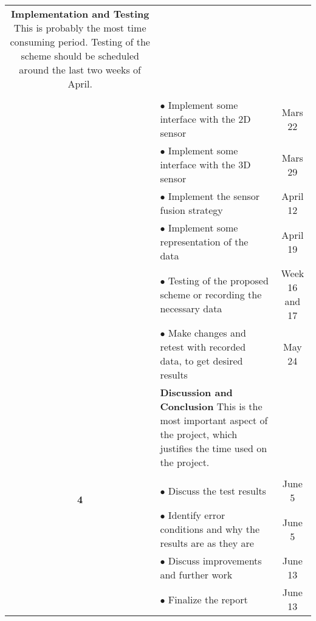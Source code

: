 \documentclass[a4paper, 10pt]{article}
\begin{document}
\begin{tabular}{| c | p{10.5cm} || c |}
                        \textbf{Implementation and Testing} This is probably the most
                        time consuming period. Testing of the scheme should be scheduled
                        around the last two weeks of April.  & \\
                        & & \\
                        & $\bullet$ Implement some interface with the 2D sensor & Mars 22  \\
                        & $\bullet$ Implement some interface with the 3D sensor & Mars 29 \\
                        & $\bullet$ Implement the sensor fusion strategy & April 12 \\
                        & $\bullet$ Implement some representation of the data & April 19 \\
                        & $\bullet$ Testing of the proposed scheme or recording the necessary data & Week 16 and 17 \\
                        & $\bullet$ Make changes and retest with recorded data, to get desired
                        results & May 24 \\
        \hline
        \multirow{6}{*}{\textbf{4}}  &   
                        \textbf{Discussion and Conclusion} This is the most important
                        aspect of the project, which justifies the time used on the
                        project. & \\
                        & &  \\
                        & $\bullet$ Discuss the test results & June 5 \\
                        & $\bullet$ Identify error conditions and why the results are as they are &
                                            June 5 \\
                        & $\bullet$ Discuss improvements and further work & June 13 \\
                        & $\bullet$ Finalize the report & June 13 \\
    \hline
\end{tabular}
\end{document}
